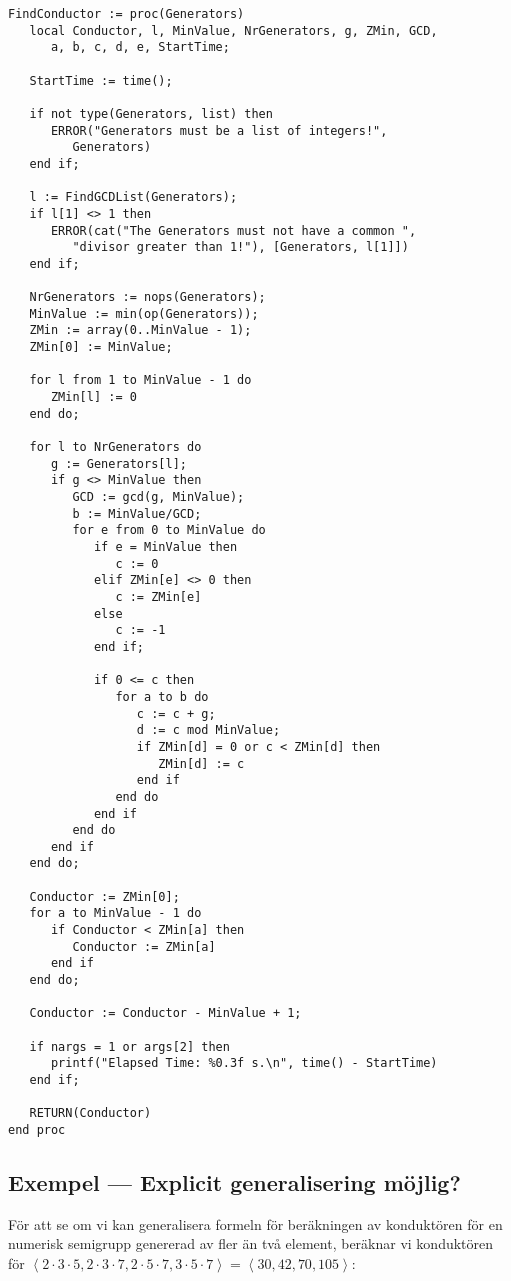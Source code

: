 \begin{verbatim}
FindConductor := proc(Generators)
   local Conductor, l, MinValue, NrGenerators, g, ZMin, GCD, 
      a, b, c, d, e, StartTime;

   StartTime := time();

   if not type(Generators, list) then
      ERROR("Generators must be a list of integers!", 
         Generators)
   end if;

   l := FindGCDList(Generators);
   if l[1] <> 1 then
      ERROR(cat("The Generators must not have a common ",
         "divisor greater than 1!"), [Generators, l[1]])
   end if;

   NrGenerators := nops(Generators);
   MinValue := min(op(Generators));
   ZMin := array(0..MinValue - 1);
   ZMin[0] := MinValue;

   for l from 1 to MinValue - 1 do
      ZMin[l] := 0
   end do;

   for l to NrGenerators do
      g := Generators[l];
      if g <> MinValue then
         GCD := gcd(g, MinValue);
         b := MinValue/GCD;
         for e from 0 to MinValue do
            if e = MinValue then
               c := 0
            elif ZMin[e] <> 0 then
               c := ZMin[e]
            else
               c := -1
            end if;

            if 0 <= c then
               for a to b do
                  c := c + g;
                  d := c mod MinValue;
                  if ZMin[d] = 0 or c < ZMin[d] then
                     ZMin[d] := c
                  end if
               end do
            end if
         end do
      end if
   end do;

   Conductor := ZMin[0];
   for a to MinValue - 1 do
      if Conductor < ZMin[a] then
         Conductor := ZMin[a]
      end if
   end do;

   Conductor := Conductor - MinValue + 1;

   if nargs = 1 or args[2] then
      printf("Elapsed Time: %0.3f s.\n", time() - StartTime)
   end if;

   RETURN(Conductor)
end proc
\end{verbatim}

\subsection{Exempel --- Explicit generalisering möjlig?}
\label{ConductorGeneralized}

För att se om vi kan generalisera formeln för beräkningen av konduktören för en numerisk semigrupp genererad av fler än två element, beräknar vi konduktören för $\left<2 \cdot 3 \cdot 5, 2 \cdot 3 \cdot 7, 2 \cdot 5 \cdot 7, 3 \cdot 5 \cdot 7\right> = \left<30, 42, 70, 105\right>$:


